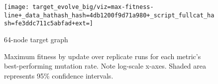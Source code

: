 \begin{figure*}
\begin{minipage}{0.75\textwidth}
\texttt{[image: target\_evolve\_big/viz=max-fitness-line+\_data\_hathash\_hash=4db1200f9d71a980+\_script\_fullcat\_hash=fe3ddc711c5abfad+ext=]}
\caption{64-node target graph}
\label{fig:evolve_big_bests}
\end{minipage}%
\begin{minipage}{0.25\textwidth}
\caption{
Maximum fitness by update over replicate runs for each metric's best-performing mutation rate.
Note log-scale x-axes.
Shaded area represents 95\% confidence intervals.
}
\label{fig:evolve_bests64}
\end{minipage}
\end{figure*}

